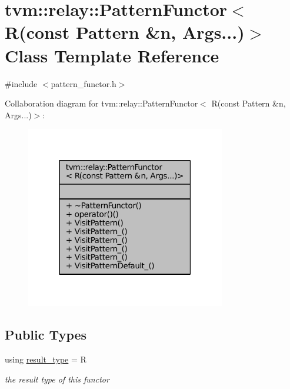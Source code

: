 \hypertarget{classtvm_1_1relay_1_1PatternFunctor_3_01R_07const_01Pattern_01_6n_00_01Args_8_8_8_08_4}{}\section{tvm\+:\+:relay\+:\+:Pattern\+Functor$<$ R(const Pattern \&n, Args...)$>$ Class Template Reference}
\label{classtvm_1_1relay_1_1PatternFunctor_3_01R_07const_01Pattern_01_6n_00_01Args_8_8_8_08_4}


{\ttfamily \#include $<$pattern\+\_\+functor.\+h$>$}



Collaboration diagram for tvm\+:\+:relay\+:\+:Pattern\+Functor$<$ R(const Pattern \&n, Args...)$>$\+:
\nopagebreak
\begin{figure}[H]
\begin{center}
\leavevmode
\includegraphics[width=247pt]{classtvm_1_1relay_1_1PatternFunctor_3_01R_07const_01Pattern_01_6n_00_01Args_8_8_8_08_4__coll__graph}
\end{center}
\end{figure}
\subsection*{Public Types}
\begin{DoxyCompactItemize}
\item 
using \hyperlink{classtvm_1_1relay_1_1PatternFunctor_3_01R_07const_01Pattern_01_6n_00_01Args_8_8_8_08_4_ad3446527dc668d6e1b3e753378d4e4d6}{result\+\_\+type} = R
\begin{DoxyCompactList}\small\item\em the result type of this functor \end{DoxyCompactList}\end{DoxyCompactItemize}
